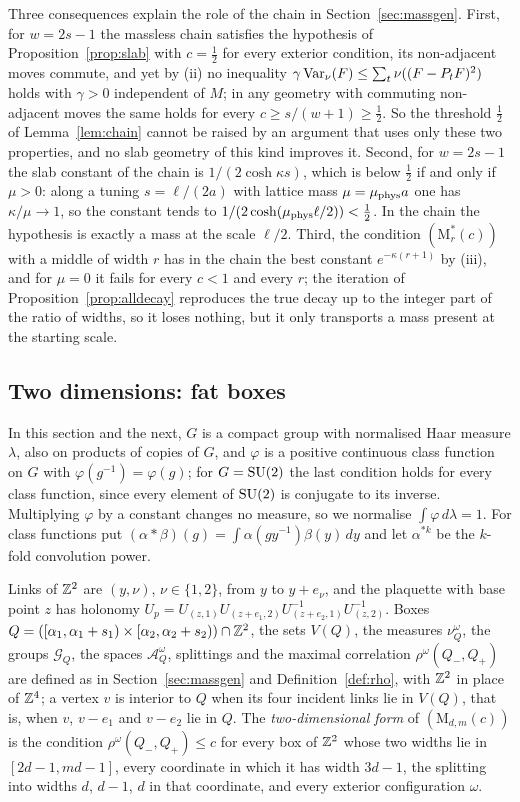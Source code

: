 Three consequences explain the role of the chain in Section~\ref{sec:massgen}.
First, for $w=2s-1$ the massless chain satisfies the hypothesis of
Proposition~\ref{prop:slab} with $c=\frac12$ for every exterior condition, its
non-adjacent moves commute, and yet by (ii) no inequality $\gamma\operatorname{Var}_\nu(F)\le
\sum_t\nu((F-P_tF)^2)$ holds with $\gamma>0$ independent of $M$; in any geometry
with commuting non-adjacent moves the same holds for every $c\ge s/(w+1)\ge
\frac12$. So the threshold $\frac12$ of Lemma~\ref{lem:chain} cannot be raised
by an argument that uses only these two properties, and no slab geometry of
this kind improves it. Second, for $w=2s-1$ the slab constant of the chain is
$1/(2\cosh\kappa s)$, which is below $\frac12$ if and only if $\mu>0$: along a
tuning $s=\ell/(2a)$ with lattice mass $\mu=\mu_{\rm phys}a$ one has $\kappa/
\mu\to1$, so the constant tends to $1/(2\cosh(\mu_{\rm phys}\ell/2))<\frac12$.
In the chain the hypothesis is exactly a mass at the scale $\ell/2$. Third, the
condition $(\mathrm M^*_r(c))$ with a middle of width $r$ has in the chain
the best constant $e^{-\kappa(r+1)}$ by (iii), and for $\mu=0$ it fails for
every $c<1$ and every $r$; the iteration of Proposition~\ref{prop:alldecay} reproduces the
true decay up to the integer part of the ratio of widths, so it loses nothing,
but it only transports a mass present at the starting scale.

\subsection{Two dimensions: fat boxes}\label{ssec:twodfat}

In this section and the next, $G$ is a compact group with normalised Haar
measure $\lambda$, also on products of copies of $G$, and $\varphi$ is a
positive continuous class function on $G$ with $\varphi(g^{-1})=\varphi(g)$; for
$G=\mathrm{SU}(2)$ the last condition holds for every class function, since every
element of $\mathrm{SU}(2)$ is conjugate to its inverse. Multiplying $\varphi$ by a
constant changes no measure, so we normalise $\int\varphi\,d\lambda=1$. For
class functions put $(\alpha*\beta)(g)=\int\alpha(gy^{-1})\beta(y)\,dy$ and let
$\alpha^{*k}$ be the $k$-fold convolution power.

Links of $\mathbb{Z}^2$ are $(y,\nu)$, $\nu\in\{1,2\}$, from $y$ to $y+e_\nu$, and the
plaquette with base point $z$ has holonomy $U_p=U_{(z,1)}U_{(z+e_1,2)}
U_{(z+e_2,1)}^{-1}U_{(z,2)}^{-1}$. Boxes $Q=([\alpha_1,\alpha_1+s_1)\times[
\alpha_2,\alpha_2+s_2))\cap\mathbb{Z}^2$, the sets $V(Q)$, the measures $\nu^\omega_Q$,
the groups $\mathcal G_Q$, the spaces $\mathcal A^\omega_Q$, splittings and the
maximal correlation $\rho^\omega(Q_-,Q_+)$ are defined as in
Section~\ref{sec:massgen} and Definition~\ref{def:rho}, with $\mathbb{Z}^2$ in place of
$\mathbb{Z}^4$; a vertex $v$ is interior to $Q$ when its four incident links lie in
$V(Q)$, that is, when $v$, $v-e_1$ and $v-e_2$ lie in $Q$. The
\emph{two-dimensional form} of $(\mathrm M_{d,m}(c))$ is the condition
$\rho^\omega(Q_-,Q_+)\le c$ for every box of $\mathbb{Z}^2$ whose two widths lie in
$[2d-1,md-1]$, every coordinate in which it has width $3d-1$, the splitting into
widths $d$, $d-1$, $d$ in that coordinate, and every exterior configuration
$\omega$.


